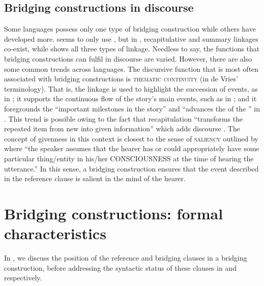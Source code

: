 \documentclass[output=paper]{LSP/langsci}
\begin{document}
\subsection{Bridging constructions in discourse}
\label{GuAi1.3discours}
Some languages possess only one type of bridging construction while others have developed more.  seems to only use , but in , recapitulative and summary linkages co-exist, while  shows all three types of linkage. Needless to say, the functions that bridging constructions can fulfil in discourse are varied. However, there are also some common trends across languages. The discursive function that is most often associated with bridging constructions is \textsc{thematic continuity} (in de Vries’ \citeyear{devries.2005} terminology). That is, the linkage is used to highlight the succession of events, as in  \citep[][259]{dimock09}; it supports the continuous flow of the story’s main events, such as in  \citep[][151--153]{kleef88}; and it foregrounds the ``important milestones in the story'' and ``advances the  of the ” in  \citep[][118--120]{Guillaume2011}. This trend is possible owing to the fact that recapitulation ``transforms the repeated item from new into given information'' \citep[][224--225]{brown.2000} which adds discourse . The concept of givenness in this context is closest to the sense of \textsc{saliency} outlined by \citet[][228]{prince81} where ``the speaker assumes that the hearer has or could appropriately have some particular thing/entity in his/her CONSCIOUSNESS at the time of hearing the utterance.'' In this sense, a bridging construction ensures that the event described in the reference clause is salient in the mind of the hearer. 

\section{Bridging constructions: formal characteristics}\label{sec:guerin:2}
\label{GuAi2formalcharac}
In , we discuss the position of the reference and bridging clauses in a bridging construction, before addressing the syntactic status of these clauses in  and  respectively. 
\end{document}
